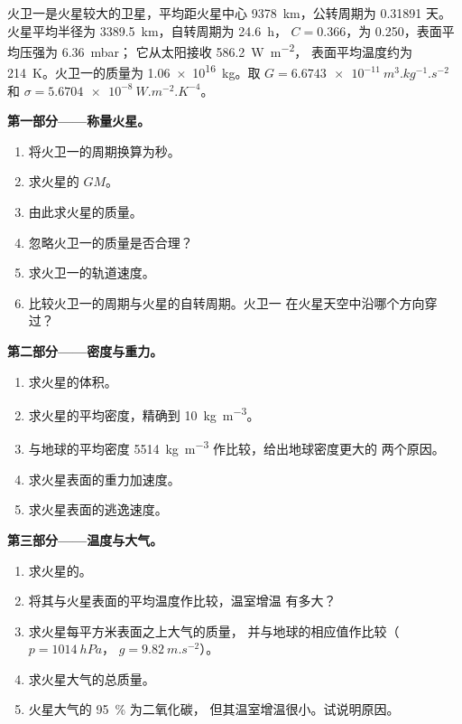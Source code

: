 \begin{problem}
\label{pb:b1:comparative-planetology:1}
火卫一是火星较大的卫星，平均距火星中心
\qty{9378}{km}，公转周期为 \num{0.31891} 天。火星平均半径为
\qty{3389.5}{km}，自转周期为 \qty{24.6}{h}，
 $C = 0.366$，为 0.250，表面平均压强为 \qty{6.36}{mbar}；
它从太阳接收 \qty{586.2}{W.m^{-2}}，
表面平均温度约为 \qty{214}{K}。火卫一的质量为
\qty{1.06e16}{kg}。取 $G = \qty{6.6743e-11}{m^3.kg^{-1}.s^{-2}}$
和 $\sigma = \qty{5.6704e-8}{W.m^{-2}.K^{-4}}$。

\medskip
\noindent\textbf{第一部分——称量火星。}
\begin{enumerate}
  \item 将火卫一的周期换算为秒。
  \item 求火星的 $GM$。
  \item 由此求火星的质量。
  \item 忽略火卫一的质量是否合理？
  \item 求火卫一的轨道速度。
  \item 比较火卫一的周期与火星的自转周期。火卫一
        在火星天空中沿哪个方向穿过？
\end{enumerate}

\medskip
\noindent\textbf{第二部分——密度与重力。}
\begin{enumerate}[resume]
  \item 求火星的体积。
  \item 求火星的平均密度，精确到 \qty{10}{kg.m^{-3}}。
  \item 与地球的平均密度 \qty{5514}{kg.m^{-3}} 作比较，给出地球密度更大的
        两个原因。
  \item 求火星表面的重力加速度。
  \item 求火星表面的逃逸速度。
\end{enumerate}

\medskip
\noindent\textbf{第三部分——温度与大气。}
\begin{enumerate}[resume]
  \item 求火星的。
  \item 将其与火星表面的平均温度作比较，温室增温
        有多大？
  \item 求火星每平方米表面之上大气的质量，
        并与地球的相应值作比较（$p = \qty{1014}{hPa}$，
        $g = \qty{9.82}{m.s^{-2}}$）。
  \item 求火星大气的总质量。
  \item 火星大气的 \qty{95}{\percent} 为二氧化碳，
        但其温室增温很小。试说明原因。
\end{enumerate}


\end{problem}
